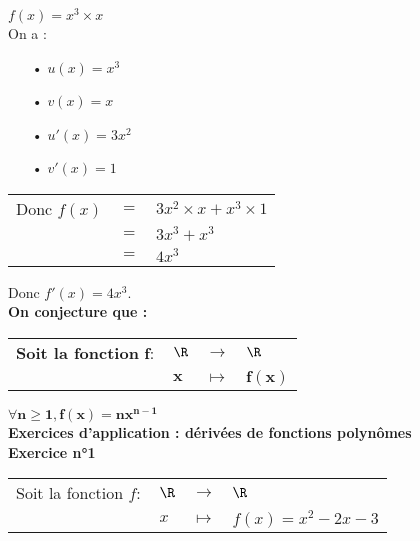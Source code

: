 \vspace*{.3cm}

$f(x) = x^3 \times x$ \\

On a : \\

\begin{itemize}
\item[•] $u\left(x\right) = x^3$
\item[•] $v\left(x\right) = x$
\item[•] $u'\left(x\right) = 3x^2$
\item[•] $v'\left(x\right) = 1$
\end{itemize}

\vspace*{.3cm}

\begin{tabular}{lll}
Donc $f(x)$ & $=$ & $3x^2 \times x + x^3 \times 1$ \\
& $=$ & $3x^3 + x^3$ \\
& $=$ & $4x^3$ \\
\end{tabular}

\vspace*{.3cm}

Donc $f'(x) = 4x^3$. \\

\textbf{On conjecture que :} \\

\begin{tabular}{llll}
\textbf{Soit la fonction }$\mathbf{f} :$ & $\mathbf{\R}$ & $\mathbf{\longrightarrow}$ & $\mathbf{\R}$ \\
& $\mathbf{x}$ & $\mathbf{\longmapsto}$ & $\mathbf{f(x)}$ \\
\end{tabular}

\vspace*{.3cm}

$\mathbf{\forall n \geqslant 1, f(x) = nx^{n-1}}$ \\

\textbf{Exercices d'application : dérivées de fonctions polynômes} \\

\textbf{Exercice n°1} \\

\begin{tabular}{llll}
Soit la fonction $f :$ & $\R$ & $\longrightarrow$ & $\R$ \\
& $x$ & $\longmapsto$ & $f(x) = x^2 - 2x - 3$ \\
\end{tabular}

